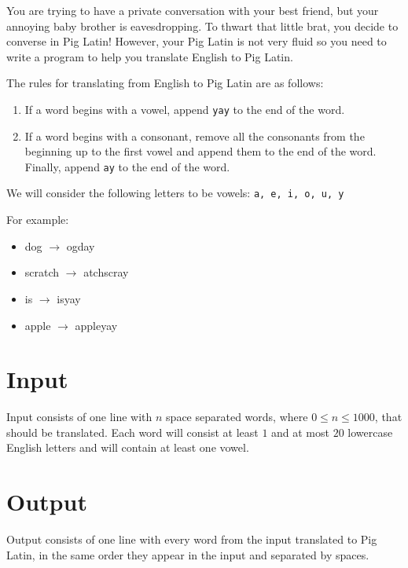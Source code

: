 

You are trying to have a private conversation with your best friend, but your annoying baby brother is eavesdropping.
To thwart that little brat, you decide to converse in Pig Latin!
However, your Pig Latin is not very fluid so you need to write a program to help you translate English to Pig Latin.

The rules for translating from English to Pig Latin are as follows:
\begin{enumerate}
\item If a word begins with a vowel,
    append \texttt{yay} to the end of the word.
\item If a word begins with a consonant,
    remove all the consonants from the beginning up to the first vowel
    and append them to the end of the word.
    Finally, append \texttt{ay} to the end of the word.
\end{enumerate}

We will consider the following letters to be vowels: \texttt{a, e, i, o, u, y}

For example:
\begin{itemize}
    \item dog $\rightarrow$ ogday
    \item scratch $\rightarrow$ atchscray
    \item is $\rightarrow$ isyay
    \item apple $\rightarrow$ appleyay
\end{itemize}

\section*{Input}
Input consists of one line with $n$ space separated words, where $0 \leq n \leq 1000$, that should be translated.
Each word will consist at least $1$ and at most $20$ lowercase English letters and will contain at least one vowel.

\section*{Output}
Output consists of one line with every word from the input translated to Pig Latin, in the same order they appear in the input and separated by spaces.
